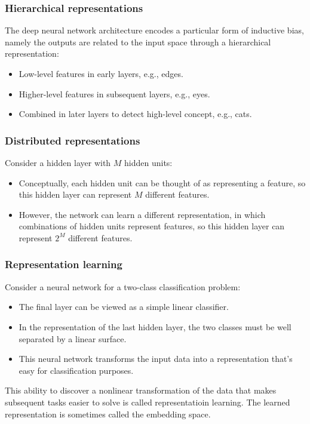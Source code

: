 \documentclass{beamer}
\begin{document}
\begin{frame}
    \frametitle{Hierarchical representations}
    The deep neural network architecture encodes a particular form of inductive bias, namely the outputs are related to the input space through a hierarchical representation:
    \begin{itemize}
        \item Low-level features in early layers, e.g., edges.
        \item Higher-level features in subsequent layers, e.g., eyes.
        \item Combined in later layers to detect high-level concept, e.g., cats.
    \end{itemize}
\end{frame}

\begin{frame}
    \frametitle{Distributed representations}
    Consider a hidden layer with $M$ hidden units:
    \begin{itemize}
        \item Conceptually, each hidden unit can be thought of as representing a feature, so this hidden layer can represent $M$ different features.
        \item However, the network can learn a different representation, in which combinations of hidden units represent features, so this hidden layer can represent $2^{M}$ different features.
    \end{itemize}
\end{frame}

\begin{frame}
    \frametitle{Representation learning}
    Consider a neural network for a two-class classification problem:
    \begin{itemize}
        \item The final layer can be viewed as a simple linear classifier.
        \item In the representation of the last hidden layer, the two classes must be well separated by a linear surface.
        \item This neural network transforms the input data into a representation that's easy for classification purposes.
    \end{itemize}
    This ability to discover a nonlinear transformation of the data that makes subsequent tasks easier to solve is called representatioin learning. The learned representation is sometimes called the embedding space.
\end{frame}
\end{document}

